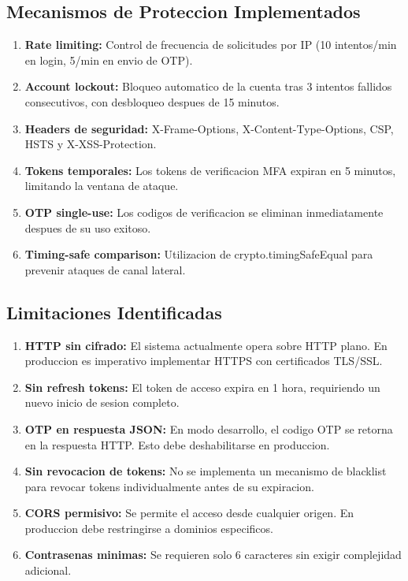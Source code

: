 \documentclass[12pt,a4paper]{article}
\begin{document}
\subsection{Mecanismos de Proteccion Implementados}

\begin{enumerate}[leftmargin=*, itemsep=3pt]
    \item \textbf{Rate limiting:} Control de frecuencia de solicitudes por IP (10 intentos/min en login, 5/min en envio de OTP).
    \item \textbf{Account lockout:} Bloqueo automatico de la cuenta tras 3 intentos fallidos consecutivos, con desbloqueo despues de 15 minutos.
    \item \textbf{Headers de seguridad:} X-Frame-Options, X-Content-Type-Options, CSP, HSTS y X-XSS-Protection.
    \item \textbf{Tokens temporales:} Los tokens de verificacion MFA expiran en 5 minutos, limitando la ventana de ataque.
    \item \textbf{OTP single-use:} Los codigos de verificacion se eliminan inmediatamente despues de su uso exitoso.
    \item \textbf{Timing-safe comparison:} Utilizacion de crypto.timingSafeEqual para prevenir ataques de canal lateral.
\end{enumerate}

\subsection{Limitaciones Identificadas}

\begin{enumerate}[leftmargin=*, itemsep=3pt]
    \item \textbf{HTTP sin cifrado:} El sistema actualmente opera sobre HTTP plano. En produccion es imperativo implementar HTTPS con certificados TLS/SSL.
    \item \textbf{Sin refresh tokens:} El token de acceso expira en 1 hora, requiriendo un nuevo inicio de sesion completo.
    \item \textbf{OTP en respuesta JSON:} En modo desarrollo, el codigo OTP se retorna en la respuesta HTTP. Esto debe deshabilitarse en produccion.
    \item \textbf{Sin revocacion de tokens:} No se implementa un mecanismo de blacklist para revocar tokens individualmente antes de su expiracion.
    \item \textbf{CORS permisivo:} Se permite el acceso desde cualquier origen. En produccion debe restringirse a dominios especificos.
    \item \textbf{Contrasenas minimas:} Se requieren solo 6 caracteres sin exigir complejidad adicional.
\end{enumerate}
\end{document}
